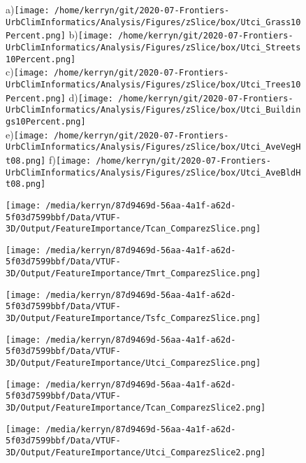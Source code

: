 \documentclass{article}
\begin{document}
\begin{figure}
\centering    
a)\texttt{[image: /home/kerryn/git/2020-07-Frontiers-UrbClimInformatics/Analysis/Figures/zSlice/box/Utci\_Grass10Percent.png]}
b)\texttt{[image: /home/kerryn/git/2020-07-Frontiers-UrbClimInformatics/Analysis/Figures/zSlice/box/Utci\_Streets10Percent.png]}\\
c)\texttt{[image: /home/kerryn/git/2020-07-Frontiers-UrbClimInformatics/Analysis/Figures/zSlice/box/Utci\_Trees10Percent.png]}
d)\texttt{[image: /home/kerryn/git/2020-07-Frontiers-UrbClimInformatics/Analysis/Figures/zSlice/box/Utci\_Buildings10Percent.png]}\\
e)\texttt{[image: /home/kerryn/git/2020-07-Frontiers-UrbClimInformatics/Analysis/Figures/zSlice/box/Utci\_AveVegHt08.png]}
f)\texttt{[image: /home/kerryn/git/2020-07-Frontiers-UrbClimInformatics/Analysis/Figures/zSlice/box/Utci\_AveBldHt08.png]}
\end{figure} 
\clearpage


\begin{figure}
\centering    
\texttt{[image: /media/kerryn/87d9469d-56aa-4a1f-a62d-5f03d7599bbf/Data/VTUF-3D/Output/FeatureImportance/Tcan\_ComparezSlice.png]}
\end{figure} 
\clearpage


\begin{figure}
\centering    
\texttt{[image: /media/kerryn/87d9469d-56aa-4a1f-a62d-5f03d7599bbf/Data/VTUF-3D/Output/FeatureImportance/Tmrt\_ComparezSlice.png]}
\end{figure} 
\clearpage


\begin{figure}
\centering    
\texttt{[image: /media/kerryn/87d9469d-56aa-4a1f-a62d-5f03d7599bbf/Data/VTUF-3D/Output/FeatureImportance/Tsfc\_ComparezSlice.png]}
\end{figure} 
\clearpage

\begin{figure}
\centering    
\texttt{[image: /media/kerryn/87d9469d-56aa-4a1f-a62d-5f03d7599bbf/Data/VTUF-3D/Output/FeatureImportance/Utci\_ComparezSlice.png]}
\end{figure} 
\clearpage



\begin{figure}
\centering    
\texttt{[image: /media/kerryn/87d9469d-56aa-4a1f-a62d-5f03d7599bbf/Data/VTUF-3D/Output/FeatureImportance/Tcan\_ComparezSlice2.png]}
\end{figure} 
\clearpage


\begin{figure}
\centering    
\texttt{[image: /media/kerryn/87d9469d-56aa-4a1f-a62d-5f03d7599bbf/Data/VTUF-3D/Output/FeatureImportance/Utci\_ComparezSlice2.png]}
\end{figure} 
\clearpage
\end{document}
